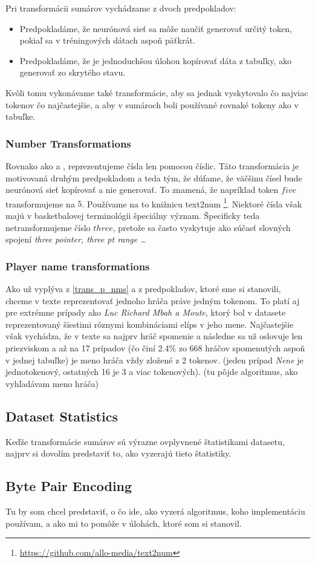 Pri transformácii sumárov vychádzame z dvoch predpokladov:
\begin{itemize}
\item Predpokladáme, že neurónová sieť sa môže naučiť generovať určitý token, pokiaľ sa v tréningových dátach aspoň päťkrát.
\item Predpokladáme, že je jednoduchšou úlohou kopírovať dáta z tabuľky, ako generovať zo skrytého stavu.
\end{itemize}

Kvôli tomu vykonávame také transformácie, aby sa jednak vyskytovalo čo najviac tokenov čo najčastejšie, a aby v sumároch boli používané rovnaké tokeny ako v tabuľke.

\subsubsection{Number Transformations}

Rovnako ako \citep{wiseman2017} a \citep{puduppully2019datatotext}, reprezentujeme čísla len pomocou číslic. Táto transformácia je motivovaná druhým predpokladom a teda tým, že dúfame, že väčšinu čísel bude neurónová sieť kopírovať a nie generovať. To znamená, že napríklad token $five$ transformujeme na $5$. Používame na to knižnicu text2num \footnote[1]{\url{https://github.com/allo-media/text2num}}. Niektoré čísla však majú v basketbalovej terminológii špeciálny význam. Špecificky teda netransformujeme číslo $three$, pretože sa často vyskytuje ako súčasť slovných spojení \emph{three pointer, three pt range \dots}

\subsubsection{Player name transformations}

Ako už vyplýva z \ref{trans_p_nms} a z predpokladov, ktoré sme si stanovili, chceme v texte reprezentovať jednoho hráča práve jedným tokenom. To platí aj pre extrémne prípady ako \emph{Luc Richard Mbah a Moute}, ktorý bol v datasete reprezentovaný šiestimi rôznymi kombináciami elíps v jeho mene. Najčastejšie však vychádza, že v texte sa najprv hráč spomenie a následne sa už oslovuje len priezviskom a až na 17 prípadov (čo činí 2.4\% zo 668 hráčov spomenutých aspoň v jednej tabuľke) je meno hráča vždy zložené z 2 tokenov. (jeden prípad \emph{Nene} je jednotokenový, ostatných 16 je 3 a viac tokenových). (tu pôjde algoritmus, ako vyhľadávam meno hráča)

\subsection{Dataset Statistics}

Keďže transformácie sumárov sú výrazne ovplyvnené štatistikami datasetu, najprv si dovolím predstaviť to, ako vyzerajú tieto štatistiky. 

\subsection{Byte Pair Encoding}

Tu by som chcel predstaviť, o čo ide, ako vyzerá algoritmus, koho implementáciu používam, a ako mi to pomôže v úlohách, ktoré som si stanovil.